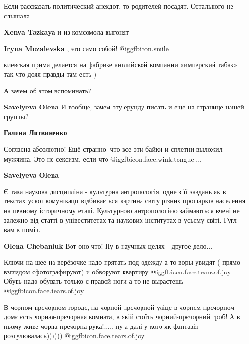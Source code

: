 \begin{itemize}
Если рассказать политический анекдот, то родителей посадят. Остального не слышала.

\begin{itemize} %
\textbf{Xenya Tazkaya} и из комсомола выгонят

\textbf{Iryna Mozalevska} , это само собой!  @igg{fbicon.smile} 
\end{itemize} %

киевская прима делается на фабрике английской компании «имперский табак» так что доля правды там есть )

А зачем об этом вспоминать?

\begin{itemize} %
\textbf{Savelyeva Olena} И вообще, зачем эту ерунду писать и еще на странице нашей группы?

\textbf{Галина Литвиненко} 

Согласна абсолютно! Ещё странно, что все эти байки и сплетни выложил мужчина.
Это не сексизм, если что  @igg{fbicon.face.wink.tongue} ...

\textbf{Savelyeva Olena} 

Є така наукова дисципліна - культурна антропологія, одне з її завдань як в
текстах усної комунікації відбивається картина світу різних прошарків населення
на певному історичному етапі. Культурною антропологією займаються вчені не
залежно від статті в унівеститетах та наукових інститутах в усьому світі. Гугл
вам в поміч.

\textbf{Olena Chebaniuk} Вот оно что! Ну в научных целях - другое дело...
\end{itemize} %


Ключи на шее на верёвочке надо прятать под одежду а то воры увидят ( прямо
взглядом сфотографируют) и обворуют квартиру  @igg{fbicon.face.tears.of.joy}  Обувь надо обувать только с
правой ноги а то не вырастешь  @igg{fbicon.face.tears.of.joy} 


В чорном-прєчорном городє, на чорной прєчорной уліце в чорном-прєчорном домє
єсть чорная-прєчорная комната, в якій стоїть чорний-прєчорний гроб! А в ньому
живе чорна-пречорна рука!..... ну а далі у кого як фантазія
розгулювалась)))))) @igg{fbicon.face.tears.of.joy} 


\end{itemize}
